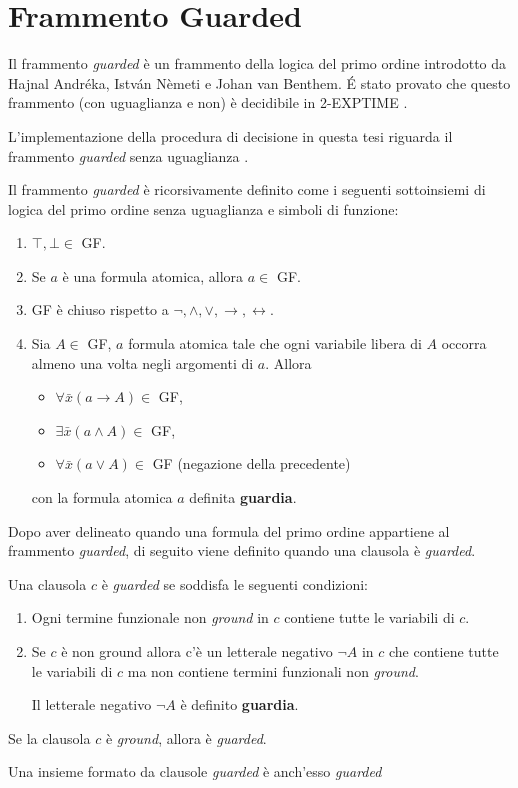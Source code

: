 \let\cleardoublepage\relax
\section{Frammento Guarded}
Il frammento \emph{guarded} è un frammento della logica del primo ordine introdotto da Hajnal Andréka,
István Nèmeti e Johan van Benthem. \'E stato provato che questo frammento (con uguaglianza e non) 
è decidibile in \textsc{2-EXPTIME} \cite{gradel1999restraining}. 

L'implementazione della procedura di decisione in questa tesi riguarda il frammento \emph{guarded} senza uguaglianza \cite{de2003deciding}.
\begin{definition}
    Il frammento \emph{guarded} è ricorsivamente definito come i seguenti sottoinsiemi di logica del primo ordine senza
    uguaglianza e simboli di funzione:
    \begin{enumerate}
        \item $\top,\bot\in$ GF.
        \item Se $a$ è una formula atomica, allora $a\in$ GF.
        \item GF è chiuso rispetto a $\lnot, \land,
        \lor, \rightarrow, \leftrightarrow$.
        \item Sia $A\in$ GF, $a$ formula atomica tale che ogni variabile libera di $A$ occorra almeno una volta negli argomenti 
        di $a$. Allora 
        \begin{itemize}
            \item $\forall\bar{x}(a \rightarrow A)\in$ GF,
            \item $\exists\bar{x}(a \land A)\in$ GF,
            \item $\forall\bar{x}(a \lor A)\in$ GF (negazione della precedente)
        \end{itemize}
        con la formula atomica $a$ definita \textbf{guardia}.
    \end{enumerate}
\end{definition}
Dopo aver delineato quando una formula del primo ordine appartiene al frammento \emph{guarded}, di seguito viene 
definito quando una clausola è \emph{guarded}.
\begin{definition}
    Una clausola $c$ è \emph{guarded} se soddisfa le seguenti condizioni:
    \begin{enumerate}
        \item Ogni termine funzionale non \emph{ground} in $c$ contiene tutte le variabili di $c$.
        \item Se $c$ è non ground allora c'è un letterale negativo $\lnot A$ in $c$ che contiene tutte le variabili di $c$ ma 
        non contiene termini funzionali non \emph{ground}.

        Il letterale negativo $\lnot A$ è definito \textbf{guardia}.
    \end{enumerate}
    Se la clausola $c$ è \emph{ground}, allora è \emph{guarded}.
\end{definition}
\begin{definition}
    Una insieme formato da clausole \emph{guarded} è anch'esso \emph{guarded}
\end{definition}
